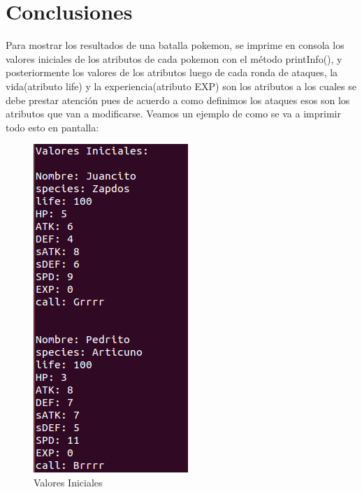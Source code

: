 \documentclass[11pt]{article}
\begin{document}
\section{Conclusiones}
Para mostrar los resultados de una batalla pokemon, se imprime en consola los valores iniciales de los atributos de cada pokemon con el m\'etodo printInfo(), y posteriormente los valores de los atributos luego de cada ronda de ataques, la vida(atributo life) y la experiencia(atributo EXP) son los atributos a los cuales se debe prestar atenci\'on pues de acuerdo a como definimos los ataques esos son los atributos que van a modificarse. 
 Veamos un ejemplo de como se va a imprimir todo esto en pantalla: 
 
\begin{figure}[ht]
\centering
\includegraphics[scale=0.4]{estr1.png}
\caption{Valores Iniciales}
\end{figure}
\end{document}

